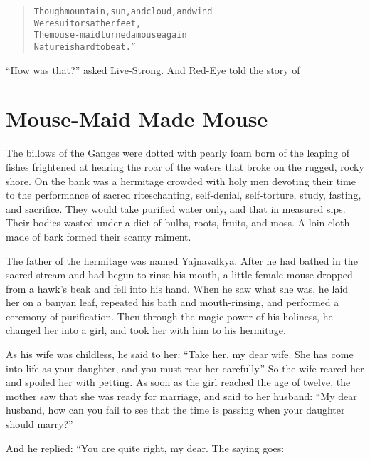 \documentclass[article, twoside, 14pt]{memoir}
\renewenvironment{verbatim}{%
\begin{quote}%
\vskip -10pt%
\begin{alltt}\normalfont\large}{\end{alltt}%
\end{quote}%
\vskip -10pt
} %
\begin{document}
\begin{verbatim}
Though mountain, sun, and cloud, and wind
    Were suitors at her feet,
The mouse-maid turned a mouse again{\textemdash}
    Nature is hard to beat.”
\end{verbatim}
``How was that?'' asked Live-Strong. And Red-Eye told the story of

\chapter{Mouse-Maid Made Mouse}

\label{s60}

The billows of the Ganges were dotted with pearly foam born
of the leaping of fishes frightened at hearing the roar of the
waters that broke on the rugged, rocky shore. On the bank was a
hermitage crowded with holy men devoting their time to the
performance of sacred rites{\textemdash}chanting, self-denial, self-torture,
study, fasting, and sacrifice. They would take purified water only,
and that in measured sips. Their bodies wasted under a diet of
bulbs, roots, fruits, and moss. A loin-cloth made of bark formed
their scanty raiment.

The father of the hermitage was named Yajnavalkya. After he had
bathed in the sacred stream and had begun to rinse his mouth, a
little female mouse dropped from a hawk's beak and fell into his
hand. When he saw what she was, he laid her on a banyan leaf,
repeated his bath and mouth-rinsing, and performed a ceremony of
purification. Then through the magic power of his holiness, he
changed her into a girl, and took her with him to his hermitage.

As his wife was childless, he said to her:
``Take her, my dear wife. She has come into life as your daughter, and you must rear her carefully.''
So the wife reared her and spoiled her with petting. As soon as the
girl reached the age of twelve, the mother saw that she was ready
for marriage, and said to her husband:
``My dear husband, how can you fail to see that the time is passing when your daughter should marry?''

And he replied: “You are quite right, my dear. The saying goes:
\end{document}
